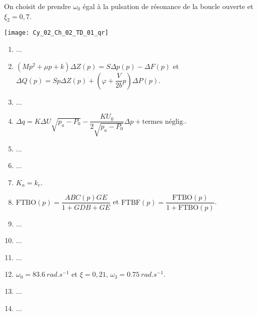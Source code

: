On choisit de prendre $\omega_0$ égal à la pulsation de résonance de la boucle ouverte et $\xi_2 = 0,7$.


\ifprof
\begin{corrige}
\end{corrige}
\else
\fi


\ifprof
\else
\begin{marginfigure}
\centering
\texttt{[image: Cy\_02\_Ch\_02\_TD\_01\_qr]}
\end{marginfigure}
\fi


\begin{solution}
\begin{enumerate}
\item ...
\item $\left(Mp^2+\mu p + k \right)\Delta Z(p) = S\Delta p (p)-\Delta F(p)$ et $\Delta Q(p)=S p \Delta Z(p) + \left( \varphi + \dfrac{V}{2b} p \right) \Delta P(p)$.
\item ...
\item $\Delta q = K\Delta U\sqrt{p_a - P_0} - \dfrac{KU_0}{2\sqrt{p_a - P_0}}\Delta p + \text{termes néglig.}$.
\item ...
\item ...
\item $K_a = k_c$.
\item $\text{FTBO}(p)=\dfrac{ABC(p)GE}{1+GDB+GE}$ et $\text{FTBF}(p)=\dfrac{\text{FTBO}(p)}{1+\text{FTBO}(p)}$.
\item ...
\item ...
\item ...
\item $\omega_0=\SI{83,6}{rad.s^{-1}}$ et $\xi=0,21$, $\omega_3 = \SI{0,75}{rad.s^{-1}}$.
\item ...
\item ...
\end{enumerate}
\end{solution}%

